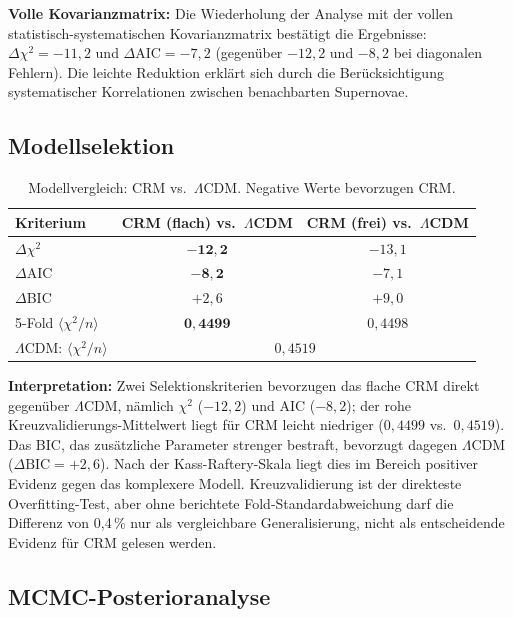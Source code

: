 \documentclass[aps,prd,twocolumn,superscriptaddress,nofootinbib]{revtex4-2}
\begin{document}
\textbf{Volle Kovarianzmatrix:} Die Wiederholung der Analyse mit der vollen statistisch-systematischen Kovarianzmatrix best\"atigt die Ergebnisse: $\Delta\chi^2 = -11{,}2$ und $\Delta\mathrm{AIC} = -7{,}2$ (gegen\"uber $-12{,}2$ und $-8{,}2$ bei diagonalen Fehlern). Die leichte Reduktion erkl\"art sich durch die Ber\"ucksichtigung systematischer Korrelationen zwischen benachbarten Supernovae.

\subsection{Modellselektion}
\label{subsec:modellselektion}

\begin{table}[htbp]
\centering
\caption{Modellvergleich: CRM vs.\ $\Lambda$CDM. Negative Werte bevorzugen CRM.}
\label{tab:comparison}
\begin{tabular}{lcc}
\toprule
\textbf{Kriterium} & CRM (flach) vs.\ $\Lambda$CDM & CRM (frei) vs.\ $\Lambda$CDM \\
\midrule
$\Delta\chi^2$ & $\mathbf{-12{,}2}$ & $-13{,}1$ \\
$\Delta$AIC & $\mathbf{-8{,}2}$ & $-7{,}1$ \\
$\Delta$BIC & $+2{,}6$ & $+9{,}0$ \\
\midrule
5-Fold $\langle\chi^2/n\rangle$ & $\mathbf{0{,}4499}$ & $0{,}4498$ \\
$\Lambda$CDM: $\langle\chi^2/n\rangle$ & \multicolumn{2}{c}{$0{,}4519$} \\
\bottomrule
\end{tabular}
\end{table}

\textbf{Interpretation:} Zwei Selektionskriterien bevorzugen das flache CRM direkt gegenüber $\Lambda$CDM, nämlich $\chi^2$ ($-12{,}2$) und AIC ($-8{,}2$); der rohe Kreuzvalidierungs-Mittelwert liegt für CRM leicht niedriger ($0{,}4499$ vs.\ $0{,}4519$). Das BIC, das zusätzliche Parameter strenger bestraft, bevorzugt dagegen $\Lambda$CDM ($\Delta\mathrm{BIC} = +2{,}6$). Nach der Kass-Raftery-Skala \cite{KassRaftery1995} liegt dies im Bereich positiver Evidenz gegen das komplexere Modell. Kreuzvalidierung ist der direkteste Overfitting-Test, aber ohne berichtete Fold-Standardabweichung darf die Differenz von 0{,}4\,\% nur als vergleichbare Generalisierung, nicht als entscheidende Evidenz für CRM gelesen werden.

\subsection{MCMC-Posterioranalyse}
\label{subsec:mcmc}
\end{document}
